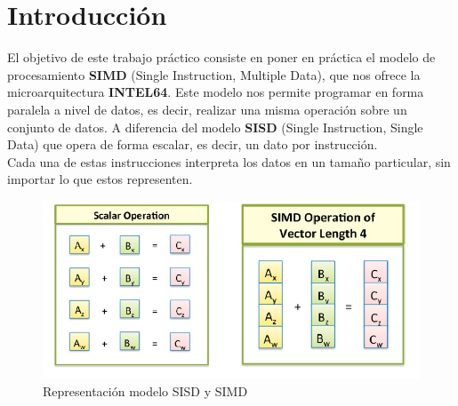 \documentclass[a4paper]{article}
\begin{document}
\thispagestyle{empty}
\hspace{20cm}


\maketitle
\newpage


\thispagestyle{empty}
\vspace{3cm}
\tableofcontents
\newpage


\newpage

\section{Introducción}

El objetivo de este trabajo práctico consiste en poner en práctica el modelo de procesamiento \textbf{SIMD} (Single Instruction, Multiple Data), que nos ofrece la microarquitectura \textbf{INTEL64}. Este modelo nos permite programar en forma paralela a nivel de datos, es decir, realizar una misma operación sobre un conjunto de datos. A diferencia del modelo \textbf{SISD} (Single Instruction, Single Data) que opera de forma escalar, es decir, un dato por instrucción. \\
Cada una de estas instrucciones interpreta los datos en un tamaño particular, sin importar lo que estos representen. 


\begin{figure}[h]
  \begin{center}
	\includegraphics[scale=0.66]{img/simd.jpg}
	\caption{Representación modelo SISD y SIMD}
	\label{simd}
  \end{center}
\end{figure}
\end{document}
